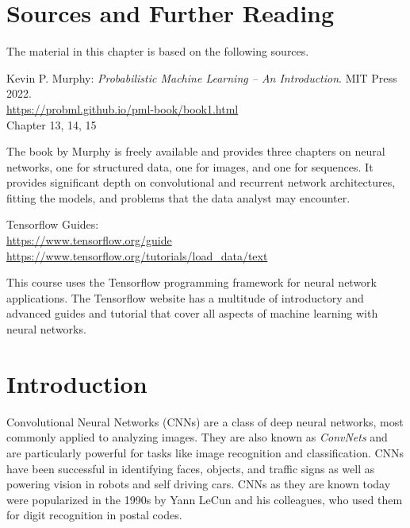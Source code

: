 %
%

\section*{Sources and Further Reading}

The material in this chapter is based on the following sources. 

\begin{tcolorbox}[colback=alert]
Kevin P. Murphy: \emph{Probabilistic Machine Learning -- An Introduction}. MIT Press 2022. \\

\url{https://probml.github.io/pml-book/book1.html} \\

Chapter 13, 14, 15

\end{tcolorbox}

The book by Murphy is freely available and provides three chapters on neural networks, one for structured data, one for images, and one for sequences. It provides significant depth on convolutional and recurrent network architectures, fitting the models, and problems that the data analyst may encounter. 

\begin{tcolorbox}[colback=alert]
Tensorflow Guides: \\
\url{https://www.tensorflow.org/guide} \\
\url{https://www.tensorflow.org/tutorials/load_data/text}
\end{tcolorbox}

This course uses the Tensorflow programming framework for neural network applications. The Tensorflow website has a multitude of introductory and advanced guides and tutorial that cover all aspects of machine learning with neural networks. 

\section{Introduction}

Convolutional Neural Networks (CNNs) are a class of deep neural networks, most commonly applied to analyzing images. They are also known as \emph{ConvNets} and are particularly powerful for tasks like image recognition and classification. CNNs have been successful in identifying faces, objects, and traffic signs as well as powering vision in robots and self driving cars. CNNs as they are known today were popularized in the 1990s by Yann LeCun and his colleagues, who used them for digit recognition in postal codes. 

